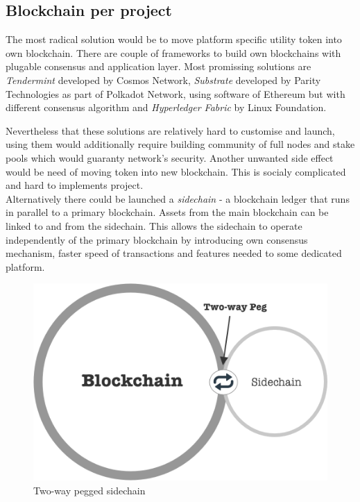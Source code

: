 \documentclass[a4paper,12pt]{article}
\begin{document}
\subsection{Blockchain per project}

The most radical solution would be to move platform specific utility token into 
own blockchain. There are couple of frameworks to build own blockchains with 
plugable consensus and application layer. Most promissing solutions are 
\textit{Tendermint} developed by Cosmos Network, \textit{Substrate} developed
by Parity Technologies as part of Polkadot Network, using software of Ethereum
but with different consensus algorithm and \textit{Hyperledger Fabric} by Linux
Foundation.

Nevertheless that these solutions are relatively hard to customise and launch, 
using them would additionally require building community of full nodes and stake 
pools which would guaranty network's security. Another unwanted side effect 
would be need of moving token into new blockchain. This is socialy complicated 
and hard to implements project. \\

Alternatively there could be launched a \textit{sidechain} - a blockchain ledger 
that runs in parallel to a primary blockchain. Assets from the main blockchain 
can be linked to and from the sidechain. This allows the sidechain to operate 
independently of the primary blockchain by introducing own consensus mechanism, 
faster speed of transactions and features needed to some dedicated platform.

\begin{figure}[H]
    \centering
    \includegraphics[scale=0.5]{../img/sidechain}
    \caption{Two-way pegged sidechain}
    \label{img:sidechain}
\end{figure}
\end{document}
